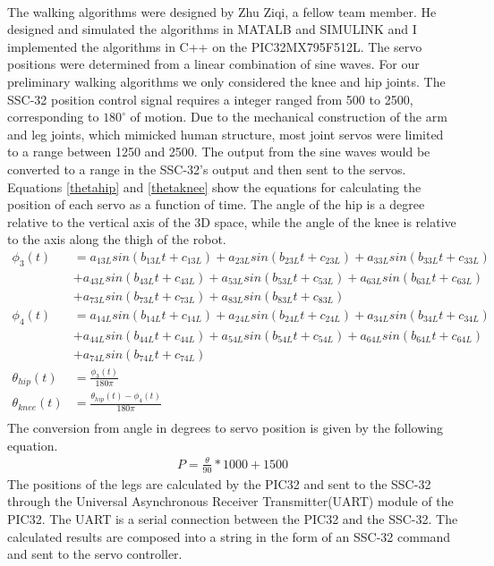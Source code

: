 \documentclass[titlepage,letterpaper,12pt]{article}
\begin{document}
\paragraph{} The walking algorithms were designed by Zhu Ziqi, a fellow team
member. He designed and simulated the algorithms in MATALB and SIMULINK and I
implemented the algorithms in C++ on the PIC32MX795F512L. The servo positions
were determined from a linear combination of sine waves. For our preliminary
walking algorithms we only considered the knee and hip joints. The SSC-32
position control signal requires a integer ranged from 500 to 2500,
corresponding to $180^{\circ}$ of motion\cite{sscdata}. Due to the mechanical
construction of the arm and leg joints, which mimicked human structure, most
joint servos were limited to a range between 1250 and 2500. The output from the
sine waves would be converted to a range in the SSC-32's output and then sent to
the servos. Equations \ref{thetahip} and \ref{thetaknee} show the equations for
calculating the position of each servo as a function of time. The angle of the
hip is a degree relative to the vertical axis of the 3D space, while the angle
of the knee is relative to the axis along the thigh of the robot.
\begin{align}
    \phi_{3}(t)&=a_{13L}sin(b_{13L}t+c_{13L})+a_{23L}sin(b_{23L}t+c_{23L})+a_{33L}sin(b_{33L}t+c_{33L})\nonumber\\
    &+a_{43L}sin(b_{43L}t+c_{43L})+a_{53L}sin(b_{53L}t+c_{53L})+a_{63L}sin(b_{63L}t+c_{63L})\nonumber\\
    &+a_{73L}sin(b_{73L}t+c_{73L})+a_{83L}sin(b_{83L}t+c_{83L}) \label{phi3}\\
    \phi_{4}(t)&=a_{14L}sin(b_{14L}t+c_{14L})+a_{24L}sin(b_{24L}t+c_{24L})+a_{34L}sin(b_{34L}t+c_{34L})\nonumber\\
    &+a_{44L}sin(b_{44L}t+c_{44L})+a_{54L}sin(b_{54L}t+c_{54L})+a_{64L}sin(b_{64L}t+c_{64L})\nonumber\\
    &+a_{74L}sin(b_{74L}t+c_{74L}) \label{phi4}\\
    \theta_{hip}(t)&=\frac{\phi_{3}(t)}{180\pi} \label{thetahip}\\
    \theta_{knee}(t)&=\frac{\theta_{hip}(t)-\phi_{4}(t)}{180\pi} \label{thetaknee}\\
\end{align}
The conversion from angle in degrees to servo position is given by the following
equation.
\begin{align}
    P=\frac{\theta}{90}*1000+1500
\end{align}
The positions of the legs are calculated by the PIC32 and sent to the SSC-32
through the Universal Asynchronous Receiver Transmitter(UART) module of the
PIC32. The UART is a serial connection between the PIC32 and the SSC-32. The
calculated results are composed into a string in the form of an SSC-32 command
and sent to the servo controller.
\end{document}
